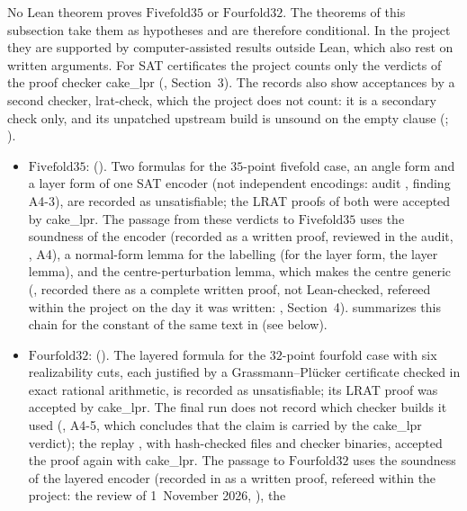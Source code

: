 \begin{remark}\label{ec:rem:cases}
No Lean theorem proves $\mathrm{Fivefold35}$ or $\mathrm{Fourfold32}$. The theorems of this subsection take them as
hypotheses and are therefore conditional. In the project they are supported by computer-assisted results outside
Lean, which also rest on written arguments. For SAT certificates the project counts only the verdicts of the proof
checker cake\_lpr (, Section~3). The records also show acceptances by a second checker,
lrat-check, which the project does not count: it is a secondary check only, and its unpatched upstream build is
unsound on the empty clause (; ).
\begin{itemize}
\item $\mathrm{Fivefold35}$:  (). Two formulas for the $35$-point fivefold case, an
  angle form and a layer form of one SAT encoder (not independent encodings: audit , finding A4-3), are
  recorded as unsatisfiable; the LRAT proofs of both were accepted by cake\_lpr. The passage from
  these verdicts to $\mathrm{Fivefold35}$ uses the soundness of the encoder (recorded as a written proof, reviewed in
  the audit, , A4), a normal-form lemma for the labelling (for the layer form, the layer lemma), and the
  centre-perturbation lemma, which makes the centre generic (, recorded there as a
  complete written proof, not Lean-checked, refereed within the project on the day it was written:
  , Section~4).  summarizes this chain for the constant of
  the same text in  (see below).
\item $\mathrm{Fourfold32}$:  (). The layered formula for the $32$-point fourfold
  case with six realizability cuts, each justified by a Grassmann--Pl\"ucker certificate checked in exact rational
  arithmetic, is recorded as unsatisfiable; its LRAT proof was accepted by cake\_lpr. The final run does not record
  which checker builds it used (, A4-5, which concludes that the claim is carried by the cake\_lpr verdict);
  the replay , with hash-checked files and checker binaries, accepted the proof again with cake\_lpr. The
  passage to $\mathrm{Fourfold32}$ uses the soundness of the layered encoder (recorded in  as a
  written proof, refereed within the project: the review of 1~November 2026, ), the

\end{itemize}
\end{remark}
